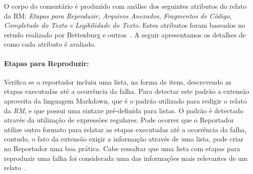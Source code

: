 \begin{table}[htpb]
\centering
{}
\caption{Critérios de aceitação e forma de análise utilizados na análise de
    qualidade do relato.}
\label{tab:criterios_analise_qualidade_relato}
\end{table}

O corpo do comentário é produzido com análise dos seguintes atributos do relato
da RM\@: \textit{Etapas para Reproduzir, Arquivos Anexados, Fragmentos de
    Código, Completude do Texto e Legibilidade do Texto}. Estes atributos foram
baseados no estudo realizado por Bettenburg e outros~\cite{bettenburg2008makes}.
A seguir apresentamos os detalhes de como cada atributo é avaliado.

\paragraph{Etapas para Reproduzir:}
\label{par:etapas_para_reproduzir_}

Verifica se o reportador incluiu uma lista, na forma de itens, descrevendo as
etapas executadas até a ocorrência da falha. Para detectar este padrão a
extensão aproveita da linguagem Markdown, que é o padrão utilizado para redigir
o relato da \textit{RM}, e que possui uma sintaxe pré-definida para listas. O
padrão é detectado através da utilização de expressões regulares. Pode ocorrer
que o Reportador utilize outro formato para relatar as etapas executadas até a
ocorrência da falha, contudo, o fato da extensão exigir a informação através de
uma lista, pode criar no Reportador uma boa prática. Cabe ressaltar que uma
lista com etapas para reproduzir uma falha foi considerada uma das informações
mais relevantes de um relato~\cite{bettenburg2008makes}.

